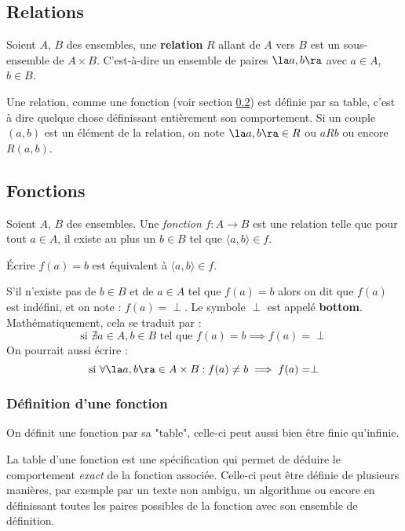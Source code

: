 
\subsection{Relations} \label{subsec:relations}
\begin{mydef}
    Soient $A$, $B$ des ensembles, une \textbf{relation} $R$ allant de $A$ vers $B$ est un sous-ensemble de $A \times B$. C'est-à-dire un ensemble de paires $\la a,b \ra$ avec $a\in A$, $b\in B$.
\end{mydef}

\begin{myrem}
  Une relation, comme une fonction (voir section \ref{subsec:fonctions}) est définie par sa table, c'est à dire quelque chose définissant entièrement son comportement. Si un couple $(a,b)$ est un élément de la relation, on note  $\la a,b \ra \in R$ ou $aR b$ ou encore $R(a,b)$.
\end{myrem}



\subsection{Fonctions}
\label{subsec:fonctions}

\begin{mydef}
    Soient $A$, $B$ des ensembles. Une \emph{fonction} $f \colon A \rightarrow B$ est une relation telle que pour tout $a \in A$, il existe au plus un $b \in B$ tel que $\langle a,b \rangle \in f$.
\end{mydef}
\begin{myrem}
    Écrire $f(a)=b$ est équivalent à $\langle a,b \rangle \in f$.
\end{myrem}
\begin{myrem}
    S'il n'existe pas de $b \in B$ et de $a \in A$ tel que $f(a)=b$ alors on dit que $f(a)$ est indéfini, et on note : $f(a) = \perp$. Le symbole $\perp$ est appelé \textbf{bottom}. Mathématiquement, cela se traduit par :
    $$ \text{si } \nexists a \in A, b \in B \text{ tel que } f(a) = b \implies f(a) = \perp $$
    On pourrait aussi écrire : 
    $$ \text{si }\forall \la a, b \ra \in A \times B : f(a) \neq b \implies f(a) = \perp $$
\end{myrem}

\subsubsection{Définition d'une fonction}
\label{par:d_finition_d_une_fonciton}
On définit une fonction par sa "table", celle-ci peut aussi bien être finie qu'infinie.\\
\begin{mydef}
    La table d'une fonction est une spécification qui permet de déduire le comportement \emph{exact} de la fonction associée. Celle-ci peut être définie de plusieurs manières, par exemple par un texte non ambigu, un algorithme ou encore en définissant toutes les paires possibles de la fonction avec son ensemble de définition.
\end{mydef}

